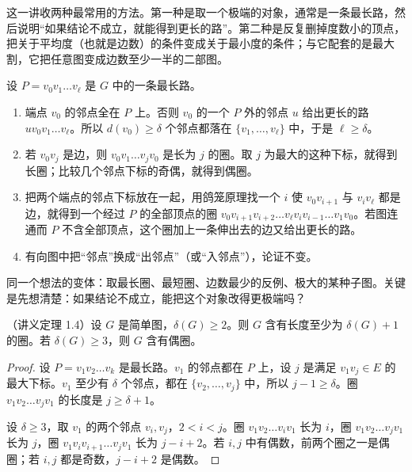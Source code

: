 \label{lec:longest-paths}

这一讲收两种最常用的方法。第一种是取一个极端的对象，通常是一条最长路，然后说明“如果结论不成立，就能得到更长的路”。第二种是反复删掉度数小的顶点，把关于平均度（也就是边数）的条件变成关于最小度的条件；与它配套的是最大割，它把任意图变成边数至少一半的二部图。


设 $P=v_0v_1\dots v_\ell$ 是 $G$ 中的一条最长路。
\begin{enumerate}
\item 端点 $v_0$ 的邻点全在 $P$ 上。否则 $v_0$ 的一个 $P$ 外的邻点 $u$ 给出更长的路 $uv_0v_1\dots v_\ell$。所以 $d(v_0)\geqslant\delta$ 个邻点都落在 $\{v_1,\dots,v_\ell\}$ 中，于是 $\ell\geqslant\delta$。
\item 若 $v_0v_j$ 是边，则 $v_0v_1\dots v_jv_0$ 是长为 $j$ 的圈。取 $j$ 为最大的这种下标，就得到长圈；比较几个邻点下标的奇偶，就得到偶圈。
\item 把两个端点的邻点下标放在一起，用鸽笼原理找一个 $i$ 使 $v_0v_{i+1}$ 与 $v_iv_\ell$ 都是边，就得到一个经过 $P$ 的全部顶点的圈 $v_0v_{i+1}v_{i+2}\dots v_\ell v_iv_{i-1}\dots v_1v_0$。若图连通而 $P$ 不含全部顶点，这个圈加上一条伸出去的边又给出更长的路。
\item 有向图中把“邻点”换成“出邻点”（或“入邻点”），论证不变。
\end{enumerate}
同一个想法的变体：取最长圈、最短圈、边数最少的反例、极大的某种子图。关键是先想清楚：如果结论不成立，能把这个对象改得更极端吗？

\begin{theorem}\label{thm:longest-paths:long-cycle}
（讲义定理 1.4）设 $G$ 是简单图，$\delta(G)\geqslant2$。则 $G$ 含有长度至少为 $\delta(G)+1$ 的圈。若 $\delta(G)\geqslant3$，则 $G$ 含有偶圈。
\end{theorem}
\begin{proof}
设 $P=v_1v_2\dots v_k$ 是最长路。$v_1$ 的邻点都在 $P$ 上，设 $j$ 是满足 $v_1v_j\in E$ 的最大下标。$v_1$ 至少有 $\delta$ 个邻点，都在 $\{v_2,\dots,v_j\}$ 中，所以 $j-1\geqslant\delta$。圈 $v_1v_2\dots v_jv_1$ 的长度是 $j\geqslant\delta+1$。

设 $\delta\geqslant3$，取 $v_1$ 的两个邻点 $v_i,v_j$，$2<i<j$。圈 $v_1v_2\dots v_iv_1$ 长为 $i$，圈 $v_1v_2\dots v_jv_1$ 长为 $j$，圈 $v_1v_iv_{i+1}\dots v_jv_1$ 长为 $j-i+2$。若 $i,j$ 中有偶数，前两个圈之一是偶圈；若 $i,j$ 都是奇数，$j-i+2$ 是偶数。
\end{proof}


